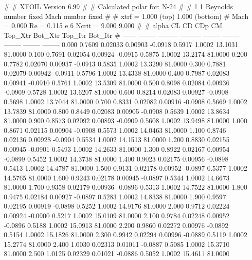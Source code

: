 #  
#       XFOIL         Version 6.99
#  
# Calculated polar for: N-24                                            
#  
# 1 1 Reynolds number fixed          Mach number fixed         
#  
# xtrf =   1.000 (top)        1.000 (bottom)  
# Mach =   0.000     Re =     0.115 e 6     Ncrit =   9.000  9.000
#  
#   alpha    CL        CD       CDp       CM     Top_Xtr  Bot_Xtr  Top_Itr  Bot_Itr
#  ------ -------- --------- --------- -------- -------- -------- -------- --------
   0.000   0.7609   0.02033   0.00903  -0.0918   0.5917   1.0002  13.1031  81.0000
   0.100   0.7691   0.02054   0.00924  -0.0915   0.5875   1.0002  13.2174  81.0000
   0.200   0.7782   0.02070   0.00937  -0.0913   0.5835   1.0002  13.3290  81.0000
   0.300   0.7881   0.02079   0.00942  -0.0911   0.5796   1.0002  13.4338  81.0000
   0.400   0.7987   0.02083   0.00941  -0.0910   0.5761   1.0002  13.5309  81.0000
   0.500   0.8098   0.02084   0.00936  -0.0909   0.5728   1.0002  13.6207  81.0000
   0.600   0.8214   0.02083   0.00927  -0.0908   0.5698   1.0002  13.7044  81.0000
   0.700   0.8331   0.02082   0.00916  -0.0908   0.5669   1.0002  13.7839  81.0000
   0.800   0.8449   0.02083   0.00905  -0.0908   0.5639   1.0002  13.8634  81.0000
   0.900   0.8573   0.02092   0.00893  -0.0909   0.5608   1.0002  13.9498  81.0000
   1.000   0.8671   0.02115   0.00904  -0.0908   0.5573   1.0002  14.0463  81.0000
   1.100   0.8746   0.02136   0.00928  -0.0904   0.5534   1.0002  14.1513  81.0000
   1.200   0.8830   0.02155   0.00945  -0.0901   0.5493   1.0002  14.2633  81.0000
   1.300   0.8922   0.02167   0.00954  -0.0899   0.5452   1.0002  14.3738  81.0000
   1.400   0.9023   0.02175   0.00956  -0.0898   0.5413   1.0002  14.4787  81.0000
   1.500   0.9131   0.02178   0.00952  -0.0897   0.5377   1.0002  14.5765  81.0000
   1.600   0.9243   0.02178   0.00945  -0.0897   0.5344   1.0002  14.6673  81.0000
   1.700   0.9358   0.02179   0.00936  -0.0896   0.5313   1.0002  14.7522  81.0000
   1.800   0.9475   0.02184   0.00927  -0.0897   0.5283   1.0002  14.8338  81.0000
   1.900   0.9597   0.02195   0.00919  -0.0898   0.5252   1.0002  14.9176  81.0000
   2.000   0.9712   0.02224   0.00924  -0.0900   0.5217   1.0002  15.0109  81.0000
   2.100   0.9784   0.02248   0.00952  -0.0896   0.5188   1.0002  15.0913  81.0000
   2.200   0.9860   0.02272   0.00976  -0.0892   0.5154   1.0002  15.1826  81.0000
   2.300   0.9942   0.02294   0.00996  -0.0889   0.5119   1.0002  15.2774  81.0000
   2.400   1.0030   0.02313   0.01011  -0.0887   0.5085   1.0002  15.3710  81.0000
   2.500   1.0125   0.02329   0.01021  -0.0886   0.5052   1.0002  15.4611  81.0000
